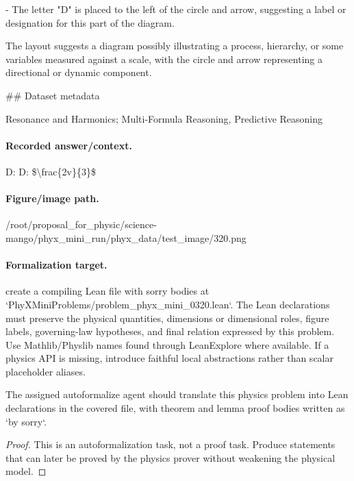 - The letter "D" is placed to the left of the circle and arrow, suggesting a label or designation for this part of the diagram.

The layout suggests a diagram possibly illustrating a process, hierarchy, or some variables measured against a scale, with the circle and arrow representing a directional or dynamic component.

\#\# Dataset metadata

Resonance and Harmonics; Multi-Formula Reasoning, Predictive Reasoning

\paragraph{Recorded answer/context.}
D: D: \$\textbackslash{}frac\{2v\}\{3\}\$

\paragraph{Figure/image path.}
/root/proposal\_for\_physic/science-mango/phyx\_mini\_run/phyx\_data/test\_image/320.png

\paragraph{Formalization target.}
create a compiling Lean file with sorry bodies at `PhyXMiniProblems/problem\_phyx\_mini\_0320.lean`. The Lean declarations must preserve the physical quantities, dimensions or dimensional roles, figure labels, governing-law hypotheses, and final relation expressed by this problem.
Use Mathlib/Physlib names found through LeanExplore where available. If a physics API is missing, introduce faithful local abstractions rather than scalar placeholder aliases.

\begin{theorem}
\label{thm:physics:phyx_mini_0320:target}
The assigned autoformalize agent should translate this physics problem into Lean declarations in the covered file, with theorem and lemma proof bodies written as `by sorry`.
\end{theorem}
\begin{proof}
This is an autoformalization task, not a proof task. Produce statements that can later be proved by the physics prover without weakening the physical model.
\end{proof}

